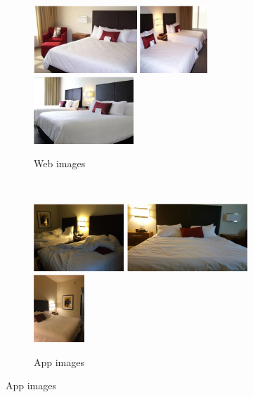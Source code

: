 \documentclass[letterpaper]{article} %
\begin{document}
\begin{figure}
\centering
    \begin{subfigure}[b]{\textwidth}
    \centering
    \includegraphics[height=1in]{figures/example_images/expedia/1.png}
    \includegraphics[height=1in]{figures/example_images/expedia/2.png}
    \includegraphics[height=1in]{figures/example_images/expedia/3.png}
    \caption{Web images}
    \end{subfigure}
    \\
   \begin{subfigure}[b]{.6\textwidth}
   \centering
    \includegraphics[height=1in]{figures/example_images/tcam/1.png}
    \includegraphics[height=1in]{figures/example_images/tcam/2.png}
    \includegraphics[height=1in]{figures/example_images/tcam/3.png}
    \caption{App images}

\end{subfigure}
\end{figure}
\end{document}
